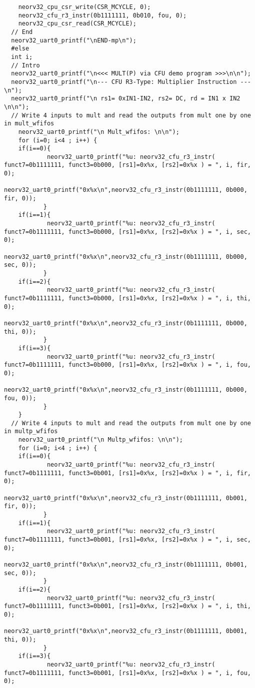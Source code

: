 \begin{code}
\begin{verbatim}
    neorv32_cpu_csr_write(CSR_MCYCLE, 0);
    neorv32_cfu_r3_instr(0b1111111, 0b010, fou, 0); 
    neorv32_cpu_csr_read(CSR_MCYCLE); 
  // End
  neorv32_uart0_printf("\nEND-mp\n");
  #else
  int i;
  // Intro
  neorv32_uart0_printf("\n<<< MULT(P) via CFU demo program >>>\n\n");
  neorv32_uart0_printf("\n--- CFU R3-Type: Multiplier Instruction ---\n");
  neorv32_uart0_printf("\n rs1= 0xIN1-IN2, rs2= DC, rd = IN1 x IN2 \n\n");
  // Write 4 inputs to mult and read the outputs from mult one by one in mult_wfifos
    neorv32_uart0_printf("\n Mult_wfifos: \n\n");
    for (i=0; i<4 ; i++) {
    if(i==0){
            neorv32_uart0_printf("%u: neorv32_cfu_r3_instr( funct7=0b1111111, funct3=0b000, [rs1]=0x%x, [rs2]=0x%x ) = ", i, fir, 0);
            neorv32_uart0_printf("0x%x\n",neorv32_cfu_r3_instr(0b1111111, 0b000, fir, 0)); 
           } 
    if(i==1){
            neorv32_uart0_printf("%u: neorv32_cfu_r3_instr( funct7=0b1111111, funct3=0b000, [rs1]=0x%x, [rs2]=0x%x ) = ", i, sec, 0);
            neorv32_uart0_printf("0x%x\n",neorv32_cfu_r3_instr(0b1111111, 0b000, sec, 0));  
           }   
    if(i==2){
            neorv32_uart0_printf("%u: neorv32_cfu_r3_instr( funct7=0b1111111, funct3=0b000, [rs1]=0x%x, [rs2]=0x%x ) = ", i, thi, 0);
            neorv32_uart0_printf("0x%x\n",neorv32_cfu_r3_instr(0b1111111, 0b000, thi, 0));  
           }   
    if(i==3){
            neorv32_uart0_printf("%u: neorv32_cfu_r3_instr( funct7=0b1111111, funct3=0b000, [rs1]=0x%x, [rs2]=0x%x ) = ", i, fou, 0);
            neorv32_uart0_printf("0x%x\n",neorv32_cfu_r3_instr(0b1111111, 0b000, fou, 0)); 
           }   
    } 
  // Write 4 inputs to mult and read the outputs from mult one by one in multp_wfifos
    neorv32_uart0_printf("\n Multp_wfifos: \n\n");
    for (i=0; i<4 ; i++) {
    if(i==0){
            neorv32_uart0_printf("%u: neorv32_cfu_r3_instr( funct7=0b1111111, funct3=0b001, [rs1]=0x%x, [rs2]=0x%x ) = ", i, fir, 0);
            neorv32_uart0_printf("0x%x\n",neorv32_cfu_r3_instr(0b1111111, 0b001, fir, 0)); 
           } 
    if(i==1){
            neorv32_uart0_printf("%u: neorv32_cfu_r3_instr( funct7=0b1111111, funct3=0b001, [rs1]=0x%x, [rs2]=0x%x ) = ", i, sec, 0);
            neorv32_uart0_printf("0x%x\n",neorv32_cfu_r3_instr(0b1111111, 0b001, sec, 0));  
           }   
    if(i==2){
            neorv32_uart0_printf("%u: neorv32_cfu_r3_instr( funct7=0b1111111, funct3=0b001, [rs1]=0x%x, [rs2]=0x%x ) = ", i, thi, 0);
            neorv32_uart0_printf("0x%x\n",neorv32_cfu_r3_instr(0b1111111, 0b001, thi, 0));  
           }   
    if(i==3){
            neorv32_uart0_printf("%u: neorv32_cfu_r3_instr( funct7=0b1111111, funct3=0b001, [rs1]=0x%x, [rs2]=0x%x ) = ", i, fou, 0);

\end{verbatim}
\end{code}
